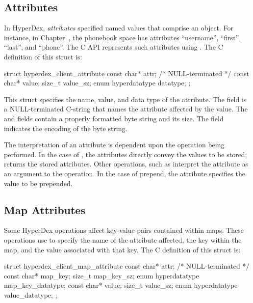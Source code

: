 \subsection{Attributes}
\label{sec:api:c:client:attributes}

In HyperDex, {\em attributes} specified named values that comprise an object.
For instance, in Chapter~, the phonebook space has
attributes ``username'', ``first'', ``last'', and ``phone''.  The C API
represents such attributes using .  The
C definition of this struct is:

\begin{ccode}
struct hyperdex_client_attribute
{
    const char* attr; /* NULL-terminated */
    const char* value;
    size_t value_sz;
    enum hyperdatatype datatype;
};
\end{ccode}

This struct specifies the name, value, and data type of the attribute.  The
 field is a NULL-terminated C-string that names the attribute
affected by the value.  The  and  fields contain a
properly formatted byte string and its size.  The  field
indicates the encoding of the byte string.

The interpretation of an attribute is dependent upon the operation being
performed.  In the case of , the attributes directly
convey the values to be stored;  returns the
stored attributes.  Other operations, such as
 interpret the attribute as an argument
to the operation.  In the case of prepend, the attribute specifies the value to
be prepended.

\subsection{Map Attributes}
\label{sec:api:c:client:map-attributes}

Some HyperDex operations affect key-value pairs contained within maps.  These
operations use  to specify the
name of the attribute affected, the key within the map, and the value associated
with that key.  The C definition of this struct is:

\begin{ccode}
struct hyperdex_client_map_attribute
{
    const char* attr; /* NULL-terminated */
    const char* map_key;
    size_t map_key_sz;
    enum hyperdatatype map_key_datatype;
    const char* value;
    size_t value_sz;
    enum hyperdatatype value_datatype;
};
\end{ccode}

